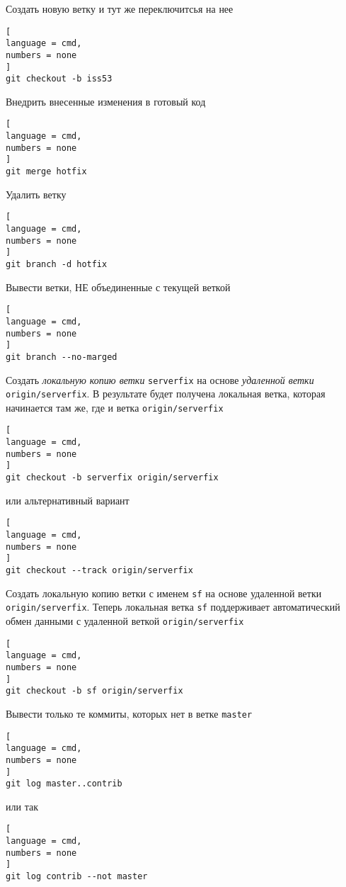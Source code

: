 \documentclass[%
	11pt,
	a4paper,
	utf8,
		]{article}
\begin{document}
Создать новую ветку и тут же переключитсья на нее

\begin{lstlisting}[
language = cmd,
numbers = none
]
git checkout -b iss53
\end{lstlisting}


Внедрить внесенные изменения в готовый код

\begin{lstlisting}[
language = cmd,
numbers = none
]
git merge hotfix
\end{lstlisting}

Удалить ветку 

\begin{lstlisting}[
language = cmd,
numbers = none
]
git branch -d hotfix
\end{lstlisting}

Вывести ветки, НЕ объединенные с текущей веткой

\begin{lstlisting}[
language = cmd,
numbers = none
]
git branch --no-marged
\end{lstlisting}


Создать \emph{локальную копию ветки} \texttt{serverfix} на основе \emph{удаленной ветки} \texttt{origin/serverfix}. В результате будет получена локальная ветка, которая начинается там же, где и ветка \texttt{origin/serverfix}

\begin{lstlisting}[
language = cmd,
numbers = none
]
git checkout -b serverfix origin/serverfix
\end{lstlisting}

\noindent или альтернативный вариант

\begin{lstlisting}[
language = cmd,
numbers = none
]
git checkout --track origin/serverfix
\end{lstlisting}

Создать локальную копию ветки с именем \texttt{sf} на основе удаленной ветки \texttt{origin/serverfix}. Теперь локальная ветка \texttt{sf} поддерживает автоматический обмен данными с удаленной веткой \texttt{origin/serverfix}

\begin{lstlisting}[
language = cmd,
numbers = none
]
git checkout -b sf origin/serverfix
\end{lstlisting}


Вывести только те коммиты, которых нет в ветке \texttt{master}

\begin{lstlisting}[
language = cmd,
numbers = none
]
git log master..contrib
\end{lstlisting}
или так
\begin{lstlisting}[
language = cmd,
numbers = none
]
git log contrib --not master
\end{lstlisting}
\end{document}
